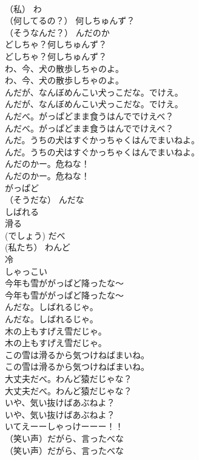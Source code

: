 \documentclass[8pt]{extreport}
\begin{document}
\begin{CJK}{UTF8}{min}
\\	（私）	わ
\\	（何してるの？）	何しちゅんず？
\\	（そうなんだ？）	んだのか
\\	どしちゃ？何しちゅんず？	
\\	どしちゃ？何しちゅんず？ 
\\	わ、今、犬の散歩しちゃのよ。	
\\	わ、今、犬の散歩しちゃのよ。 
\\	んだが、なんぼめんこい犬っこだな。でけえ。	
\\	んだが、なんぼめんこい犬っこだな。でけえ。 
\\	んだべ。がっぱどまま食うはんででけえべ？	
\\	んだべ。がっぱどまま食うはんででけえべ？ 
\\	んだ。うちの犬はすぐかっちゃくはんでまいねよ。	
\\	んだ。うちの犬はすぐかっちゃくはんでまいねよ。 
\\	んだのかー。危ねな！	
\\	んだのかー。危ねな！ 
\\	がっぱど
\\	（そうだな）	んだな
\\	しばれる
\\	滑る
\\	(でしょう)	だべ
\\	(私たち）	わんど
\\	冷 
\\	しゃっこい
\\	今年も雪ががっぱど降ったな～	
\\	今年も雪ががっぱど降ったな～ 
\\	んだな。しばれるじゃ。	
\\	んだな。しばれるじゃ。 
\\	木の上もすげえ雪だじゃ。	
\\	木の上もすげえ雪だじゃ。 
\\	この雪は滑るから気つけねばまいね。	
\\	この雪は滑るから気つけねばまいね。 
\\	大丈夫だべ。わんど猿だじゃな？	
\\	大丈夫だべ。わんど猿だじゃな？ 
\\	いや、気い抜けばあぶねよ？	
\\	いや、気い抜けばあぶねよ？ 
\\	いてえーーしゃっけーーー！！	
\\	（笑い声）だがら、言ったべな	
\\	（笑い声）だがら、言ったべな 

\end{CJK}
\end{document}
